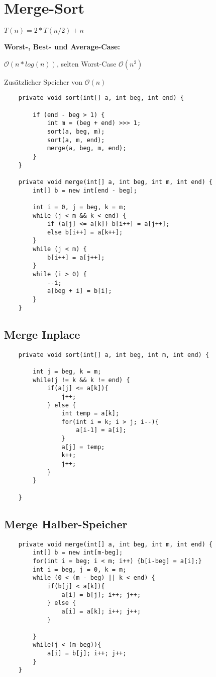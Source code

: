 \section*{Merge-Sort}

$T(n) = 2*T(n/2) + n$

\textbf{Worst-, Best- und Average-Case:} 

$\mathcal{O}(n*log(n))$, selten Worst-Case $\mathcal{O}(n^2)$

Zusätzlicher Speicher von $\mathcal{O}(n)$

\begin{verbatim}
    private void sort(int[] a, int beg, int end) {

        if (end - beg > 1) {
            int m = (beg + end) >>> 1;
            sort(a, beg, m);
            sort(a, m, end);
            merge(a, beg, m, end);
        }
    }

    private void merge(int[] a, int beg, int m, int end) {
        int[] b = new int[end - beg];

        int i = 0, j = beg, k = m;
        while (j < m && k < end) {
            if (a[j] <= a[k]) b[i++] = a[j++];
            else b[i++] = a[k++];
        }
        while (j < m) {
            b[i++] = a[j++];
        }
        while (i > 0) {
            --i;
            a[beg + i] = b[i];
        }
    }

\end{verbatim}

\subsection*{Merge Inplace}

\begin{verbatim}
    private void sort(int[] a, int beg, int m, int end) {

		int j = beg, k = m;
		while(j != k && k != end) {
			if(a[j] <= a[k]){
				j++;
			} else {
				int temp = a[k];
				for(int i = k; i > j; i--){
					a[i-1] = a[i];
				}
				a[j] = temp;
				k++;
				j++;
			}
		}
        
    }
\end{verbatim}

\subsection*{Merge Halber-Speicher}

\begin{verbatim}
    private void merge(int[] a, int beg, int m, int end) {
		int[] b = new int[m-beg];
		for(int i = beg; i < m; i++) {b[i-beg] = a[i];}
		int i = beg, j = 0, k = m;
		while (0 < (m - beg) || k < end) {
			if(b[j] < a[k]){
				a[i] = b[j]; i++; j++;
			} else {
				a[i] = a[k]; i++; j++;
			}
			
		}
		while(j < (m-beg)){
			a[i] = b[j]; i++; j++;
		}
    }
\end{verbatim}